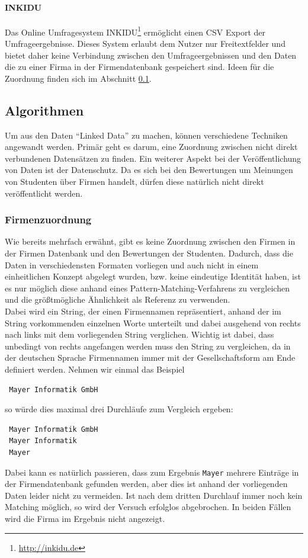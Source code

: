 \paragraph{INKIDU} Das Online Umfragesystem INKIDU\footnote{\url{http://inkidu.de}} ermöglicht einen \gls{CSV} Export der Umfrageergebnisse. Dieses System erlaubt dem Nutzer nur Freitextfelder und bietet daher keine Verbindung zwischen den Umfrageergebnissen und den Daten die zu einer Firma in der Firmendatenbank gespeichert sind. Ideen für die Zuordnung finden sich im Abschnitt \ref{sec-algo}.


\subsection{Algorithmen}
\label{sec-algo}
Um aus den Daten ``Linked Data'' zu machen, können verschiedene Techniken angewandt werden. Primär geht es darum, eine Zuordnung zwischen nicht direkt verbundenen Datensätzen zu finden. Ein weiterer Aspekt bei der Veröffentlichung von Daten ist der Datenschutz. Da es sich bei den Bewertungen um Meinungen von Studenten über Firmen handelt, dürfen diese natürlich nicht direkt veröffentlicht werden.

\subsubsection{Firmenzuordnung} %
Wie bereits mehrfach erwähnt, gibt es keine Zuordnung zwischen den Firmen in der Firmen Datenbank und den Bewertungen der Studenten. Dadurch, dass die Daten in verschiedensten Formaten vorliegen und auch nicht in einem einheitlichen Konzept abgelegt wurden, bzw. keine eindeutige Identität haben, ist es nur möglich diese anhand eines Pattern-Matching-Verfahrens zu vergleichen und die größtmögliche Ähnlichkeit als Referenz zu verwenden.\\
Dabei wird ein String, der einen Firmennamen repräsentiert, anhand der im String vorkommenden einzelnen Worte unterteilt und dabei ausgehend von rechts nach links mit dem vorliegenden String verglichen. Wichtig ist dabei, dass unbedingt von rechts angefangen werden muss den String zu vergleichen, da in der deutschen Sprache Firmennamen immer mit der Gesellschaftsform am Ende definiert werden.
Nehmen wir einmal das Beispiel
\begin{verbatim}
 Mayer Informatik GmbH
\end{verbatim}
so würde dies maximal drei Durchläufe zum Vergleich ergeben:
\begin{verbatim}
 Mayer Informatik GmbH
 Mayer Informatik
 Mayer
\end{verbatim}
Dabei kann es natürlich passieren, dass zum Ergebnis \texttt{Mayer} mehrere Einträge in der Firmendatenbank gefunden werden, aber dies ist anhand der vorliegenden Daten leider nicht zu vermeiden. Ist nach dem dritten Durchlauf immer noch kein Matching möglich, so wird der Versuch erfolglos abgebrochen. In beiden Fällen wird die Firma im Ergebnis nicht angezeigt.

